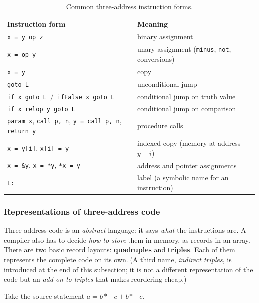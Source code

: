\documentclass[11pt,a4paper]{article}
\begin{document}
\begin{table}[htbp]
\centering
\small
\begin{tabular}{@{}l l@{}}
\toprule
\textbf{Instruction form} & \textbf{Meaning} \\ \midrule
\texttt{x = y op z} & binary assignment \\
\texttt{x = op y} & unary assignment (\texttt{minus}, \texttt{not}, conversions) \\
\texttt{x = y} & copy \\
\texttt{goto L} & unconditional jump \\
\texttt{if x goto L}\ /\ \texttt{ifFalse x goto L} & conditional jump on truth value \\
\texttt{if x relop y goto L} & conditional jump on comparison \\
\texttt{param x}, \texttt{call p, n}, \texttt{y = call p, n}, \texttt{return y} & procedure calls \\
\texttt{x = y[i]}, \texttt{x[i] = y} & indexed copy (memory at address $y + i$) \\
\texttt{x = \&y}, \texttt{x = *y}, \texttt{*x = y} & address and pointer assignments \\
\texttt{L:} & label (a symbolic name for an instruction) \\ \bottomrule
\end{tabular}
\caption{Common three-address instruction forms.}
\end{table}

\subsubsection{Representations of three-address code}
\label{sec:repr}
Three-address code is an \emph{abstract} language: it says \emph{what} the instructions are. A compiler also has to decide \emph{how to store} them in memory, as records in an array. There are two basic record layouts: \textbf{quadruples} and \textbf{triples}. Each of them represents the complete code on its own. (A third name, \emph{indirect triples}, is introduced at the end of this subsection; it is not a different representation of the code but an \emph{add-on to triples} that makes reordering cheap.)

Take the source statement $a = b * -c + b * -c$.
\end{document}
